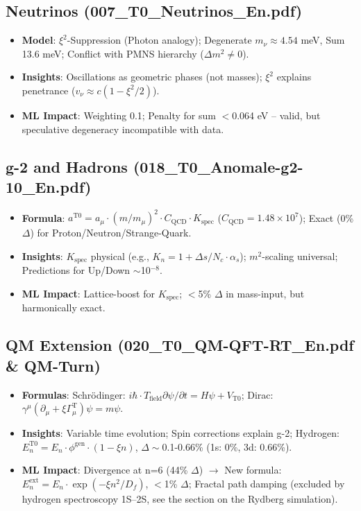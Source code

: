 	\subsection{Neutrinos (007\_T0\_Neutrinos\_En.pdf)}
	
	\begin{itemize}
		\item \textbf{Model}: $\xi^2$-Suppression (Photon analogy); Degenerate $m_\nu \approx 4.54$ meV, Sum 13.6 meV; Conflict with PMNS hierarchy ($\Delta m^2 \neq 0$).
		\item \textbf{Insights}: Oscillations as geometric phases (not masses); $\xi^2$ explains penetrance ($v_\nu \approx c (1 - \xi^2/2)$).
		\item \textbf{ML Impact}: Weighting 0.1; Penalty for sum $<$0.064 eV – valid, but speculative degeneracy incompatible with data.
	\end{itemize}
	
	\subsection{g-2 and Hadrons (018\_T0\_Anomale-g2-10\_En.pdf)}
	
	\begin{itemize}
		\item \textbf{Formula}: $a^{\text{T0}} = a_\mu \cdot (m/m_\mu)^2 \cdot C_\text{QCD} \cdot K_\text{spec}$ ($C_\text{QCD}=1.48\times10^7$); Exact (0\% $\Delta$) for Proton/Neutron/Strange-Quark.
		\item \textbf{Insights}: $K_\text{spec}$ physical (e.g., $K_n = 1 + \Delta s/N_c \cdot \alpha_s$); $m^2$-scaling universal; Predictions for Up/Down $\sim$10$^{-8}$.
		\item \textbf{ML Impact}: Lattice-boost for $K_\text{spec}$; $<$5\% $\Delta$ in mass-input, but harmonically exact.
	\end{itemize}
	
	\subsection{QM Extension (020\_T0\_QM-QFT-RT\_En.pdf \& QM-Turn)}
	
	\begin{itemize}
		\item \textbf{Formulas}: Schrödinger: $i\hbar \cdot T_\text{field} \partial\psi/\partial t = H \psi + V_\text{T0}$; Dirac: $\gamma^\mu (\partial_\mu + \xi \Gamma_\mu^\text{T}) \psi = m \psi$.
		\item \textbf{Insights}: Variable time evolution; Spin corrections explain g-2; Hydrogen: $E_n^{\text{T0}} = E_n \cdot \phi^\text{gen} \cdot (1 - \xi n)$, $\Delta\sim$0.1-0.66\% (1s: 0\%, 3d: 0.66\%).
		\item \textbf{ML Impact}: Divergence at n=6 (44\% $\Delta$) $\to$ New formula: $E_n^\text{ext} = E_n \cdot \exp(-\xi n^2 / D_f)$, $<$1\% $\Delta$; Fractal path damping (excluded by hydrogen spectroscopy 1S--2S, see the section on the Rydberg simulation).
	\end{itemize}
	

